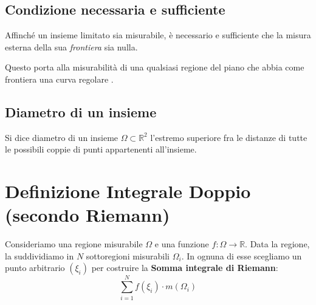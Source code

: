 \subsection{Condizione necessaria e sufficiente}
Affinché un insieme limitato sia misurabile, è necessario e sufficiente che la misura esterna della sua \textit{frontiera} sia nulla.

Questo porta alla misurabilità di una qualsiasi regione del piano che abbia come frontiera una curva regolare .

\subsection{Diametro di un insieme}
Si dice diametro di un insieme $\Omega \subset \mathbb{R}^2$ l'estremo superiore fra le distanze di tutte le possibili coppie di punti appartenenti all'insieme.

\begin{center}
\end{center}

\section{Definizione Integrale Doppio (secondo Riemann)}
Consideriamo una regione misurabile $\Omega$ e una funzione $f: \Omega \to \mathbb{R}$. 
Data la regione, la suddividiamo in $N$ sottoregioni misurabili $\Omega_i$. In ognuna di esse scegliamo un punto arbitrario $(\xi_i)$ per costruire la \textbf{Somma integrale di Riemann}:
\[ \sum_{i=1}^N f(\xi_i) \cdot m(\Omega_i) \]

